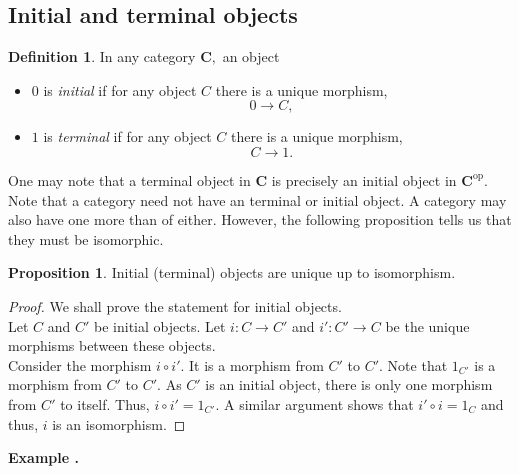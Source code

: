 \documentclass[11pt,leqno,landscape,semhelv]{seminar}
\numberwithin{equation}{section}
\theoremstyle{definition}
\newtheorem{prop}[thm]{Proposition}
\newtheorem{defn}[thm]{Definition}
\numberwithin{thm}{section}
\numberwithin{equation}{section}
\newcommand{\example}[1]{\refstepcounter{thm}\par\medskip
   {\textbf{Example \thethm.} #1} \rmfamily}
\newcommand{\op}{^{\operatorname{op}}}
\begin{document}
\subsection{Initial and terminal objects}
\begin{defn} 
	In any category $\mathbf{C},$ an object
	\begin{itemize}
		\item $0$ is \emph{initial} if for any object $C$ there is a unique morphism,
		\begin{equation*} 
			0 \to C,
		\end{equation*}
		\item $1$ is \emph{terminal} if for any object $C$ there is a unique morphism,
		\begin{equation*} 
			C \to 1.
		\end{equation*}
	\end{itemize}
\end{defn}
One may note that a terminal object in $\mathbf{C}$ is precisely an initial object in $\mathbf{C}\op.$ Note that a category need not have an terminal or initial object. A category may also have one more than of either. However, the following proposition tells us that they must be isomorphic.
\begin{prop}
	Initial (terminal) objects are unique up to isomorphism.
\end{prop}
\begin{proof} 
	We shall prove the statement for initial objects.\\
	Let $C$ and $C'$ be initial objects. Let $i:C\to C'$ and $i':C'\to C$ be the unique morphisms between these objects.\\
	Consider the morphism $i\circ i'.$ It is a morphism from $C'$ to $C'.$ Note that $1_{C'}$ is a morphism from $C'$ to $C'.$ As $C'$ is an initial object, there is only one morphism from $C'$ to itself. Thus, $i\circ i' = 1_{C'}.$ A similar argument shows that $i' \circ i = 1_C$ and thus, $i$ is an isomorphism.
\end{proof}
\example{}
\end{document}
